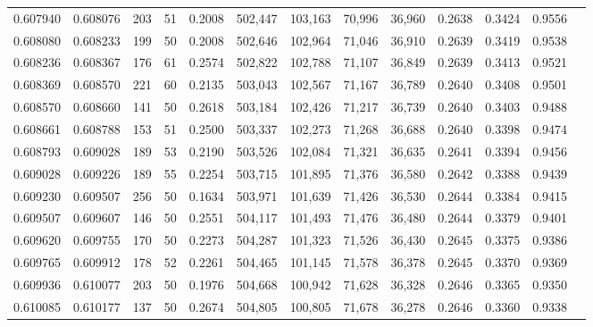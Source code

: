 \begin{tabular}{rrrrrrrrrrrrr}
0.607940 & 0.608076 &   203 &  51 &                                     0.2008 & 502,447 & 103,163 &  70,996 &  36,960 & 0.2638 & 0.3424 & 0.9556 \\
0.608080 & 0.608233 &   199 &  50 &                                     0.2008 & 502,646 & 102,964 &  71,046 &  36,910 & 0.2639 & 0.3419 & 0.9538 \\
0.608236 & 0.608367 &   176 &  61 &                                     0.2574 & 502,822 & 102,788 &  71,107 &  36,849 & 0.2639 & 0.3413 & 0.9521 \\
0.608369 & 0.608570 &   221 &  60 &                                     0.2135 & 503,043 & 102,567 &  71,167 &  36,789 & 0.2640 & 0.3408 & 0.9501 \\
0.608570 & 0.608660 &   141 &  50 &                                     0.2618 & 503,184 & 102,426 &  71,217 &  36,739 & 0.2640 & 0.3403 & 0.9488 \\
0.608661 & 0.608788 &   153 &  51 &                                     0.2500 & 503,337 & 102,273 &  71,268 &  36,688 & 0.2640 & 0.3398 & 0.9474 \\
0.608793 & 0.609028 &   189 &  53 &                                     0.2190 & 503,526 & 102,084 &  71,321 &  36,635 & 0.2641 & 0.3394 & 0.9456 \\
0.609028 & 0.609226 &   189 &  55 &                                     0.2254 & 503,715 & 101,895 &  71,376 &  36,580 & 0.2642 & 0.3388 & 0.9439 \\
0.609230 & 0.609507 &   256 &  50 &                                     0.1634 & 503,971 & 101,639 &  71,426 &  36,530 & 0.2644 & 0.3384 & 0.9415 \\
0.609507 & 0.609607 &   146 &  50 &                                     0.2551 & 504,117 & 101,493 &  71,476 &  36,480 & 0.2644 & 0.3379 & 0.9401 \\
0.609620 & 0.609755 &   170 &  50 &                                     0.2273 & 504,287 & 101,323 &  71,526 &  36,430 & 0.2645 & 0.3375 & 0.9386 \\
0.609765 & 0.609912 &   178 &  52 &                                     0.2261 & 504,465 & 101,145 &  71,578 &  36,378 & 0.2645 & 0.3370 & 0.9369 \\
0.609936 & 0.610077 &   203 &  50 &                                     0.1976 & 504,668 & 100,942 &  71,628 &  36,328 & 0.2646 & 0.3365 & 0.9350 \\
0.610085 & 0.610177 &   137 &  50 &                                     0.2674 & 504,805 & 100,805 &  71,678 &  36,278 & 0.2646 & 0.3360 & 0.9338 \\

\end{tabular}
